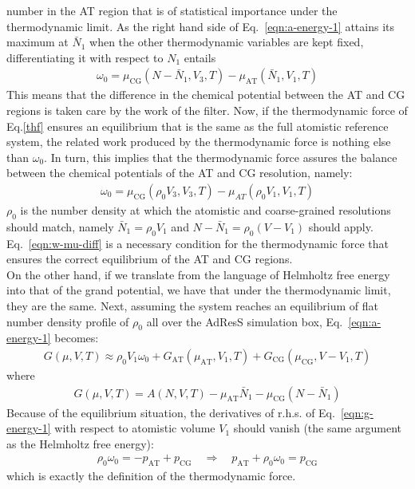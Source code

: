 \documentclass[aip,jcp,a4paper,reprint,onecolumn]{revtex4-1}
\newcommand{\AT}{{\textrm{{AT}}}}
\newcommand{\CG}{{\textrm{CG}}}
\begin{document}
number in the AT region that is of statistical importance
under the thermodynamic limit.
As the right hand side of
Eq.~\eqref{eqn:a-energy-1} attains its maximum at $\bar
N_1$ when the other thermodynamic variables are kept fixed, differentiating it with respect to $N_1$ entails
\begin{align}
  \omega_0 = \mu_{\CG}(N - \bar N_1, V_3, T)  - \mu_{\AT}(\bar N_1, V_1, T)
\end{align}
This means that the difference in the chemical potential between the AT and CG
regions is taken care by the work of the filter.
Now, if the thermodynamic force of Eq.\ref{thf} ensures an
equilibrium that is the same as the full atomistic reference system,
the related work produced by the thermodynamic force is nothing else than $\omega_0 $.
In turn, this implies that the thermodynamic force assures the balance between the chemical potentials of the AT and CG resolution,
namely:
\begin{align}\label{eqn:w-mu-diff}
  \omega_0 = \mu_{\CG}(\rho_0V_3, V_3, T) - \mu_{AT}(\rho_0 V_1, V_1, T)
\end{align}
$\rho_0$ is the number density at which the atomistic and coarse-grained
resolutions should match,
namely $\bar N_1 = \rho_0V_1$ and $N - \bar N_1 = \rho_0(V - V_1)$ should apply.
Eq.~\eqref{eqn:w-mu-diff} is a necessary
condition for the thermodynamic force that ensures
the correct equilibrium of the AT and CG regions.\\

\noindent
On the other hand, if we translate from the language of Helmholtz free
energy into that of the grand potential, we have that
under the thermodynamic limit, they are the same.
Next, assuming the system reaches an
equilibrium of flat number density profile of $\rho_0$ all over the AdResS simulation box, 
Eq.~\eqref{eqn:a-energy-1} becomes:
\begin{align}\label{eqn:g-energy-1}
  G(\mu, V, T) \approx
  \rho_0V_1\omega_0
  + G_{\AT}(\mu_{\AT}, V_1, T) + G_{\CG}(\mu_{\CG}, V - V_1, T)
\end{align}
where
\begin{align}
  G(\mu, V, T) = A(N, V, T) - \mu_{\AT} \bar N_1 - \mu_{\CG}(N - \bar N_1)
\end{align}
Because of the equilibrium situation, the derivatives of r.h.s. of
Eq.~\eqref{eqn:g-energy-1} with respect to atomistic volume $V_1$
should vanish (the same argument as the Helmholtz free energy):
\begin{align}
  \rho_0\omega_0 = -p_{\AT}+p_{\CG} \quad\Longrightarrow\quad
  p_{\AT} + \rho_0\omega_0 = p_{\CG}
\end{align}
which is exactly the definition of the thermodynamic force.
\end{document}
